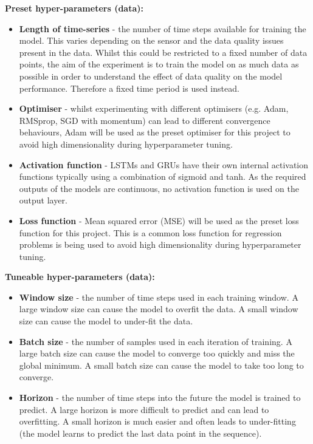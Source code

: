 \textbf{Preset hyper-parameters (data):}
\begin{itemize}
    \item \textbf{Length of time-series} - the number of time steps available for training the model. This varies depending on the sensor and the data quality issues present in the data. Whilst this could be restricted to a fixed number of data points, the aim of the experiment is to train the model on as much data as possible in order to understand the effect of data quality on the model performance. Therefore a fixed time period is used instead.
    \item \textbf{Optimiser} - whilst experimenting with different optimisers (e.g. Adam, RMSprop, SGD with momentum) can lead to different convergence behaviours, Adam will be used as the preset optimiser for this project to avoid high dimensionality during hyperparameter tuning.
    \item \textbf{Activation function} - LSTMs and GRUs have their own internal activation functions typically using a combination of sigmoid and tanh. As the required outputs of the models are continuous, no activation function is used on the output layer.
    \item \textbf{Loss function} - Mean squared error (MSE) will be used as the preset loss function for this project. This is a common loss function for regression problems is being used to avoid high dimensionality during hyperparameter tuning.
\end{itemize}

\textbf{Tuneable hyper-parameters (data):}
\begin{itemize}
    \item \textbf{Window size} - the number of time steps used in each training window. A large window size can cause the model to overfit the data. A small window size can cause the model to under-fit the data.
    \item \textbf{Batch size} - the number of samples used in each iteration of training. A large batch size can cause the model to converge too quickly and miss the global minimum. A small batch size can cause the model to take too long to converge.
    \item \textbf{Horizon} - the number of time steps into the future the model is trained to predict. A large horizon is more difficult to predict and can lead to overfitting. A small horizon is much easier and often leads to under-fitting (the model learns to predict the last data point in the sequence).
\end{itemize}

